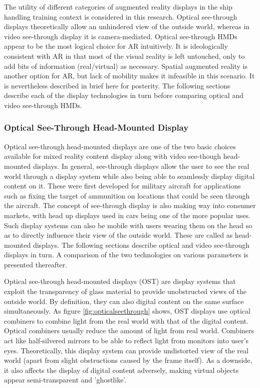 The utility of different categories of augmented reality displays in the ship handling training context is considered in this research. Optical see-through displays theoretically allow an unhindered view of the outside world, whereas in video see-through display it is camera-mediated. Optical see-through HMDs appear to be the most logical choice for AR intuitively. It is ideologically consistent with AR in that most of the visual reality is left untouched, only to add bits of information (real/virtual) as necessary. Spatial augmented reality is another option for AR, but lack of mobility makes it infeasible in this scenario. It is nevertheless described in brief here for posterity. The following sections describe each of the display technologies in turn before comparing optical and video see-through HMDs. 

\subsubsection{Optical See-Through Head-Mounted Display}
Optical see-through head-mounted displays are one of the two basic choices available for mixed reality content display along with video see-though head-mounted displays. In general, see-through displays allow the user to see the real world through a display system while also being able to seamlessly display digital content on it. These were first developed for military aircraft for applications such as fixing the target of ammunition on locations that could be seen through the aircraft. The concept of see-through display is also making way into consumer markets, with head up displays used in cars being one of the more popular uses. Such display systems can also be mobile with users wearing them on the head so as to directly influence their view of the outside world. These are called as head-mounted displays. The following sections describe optical and video see-through displays in turn. A comparison of the two technologies on various parameters is presented thereafter.

Optical see-through head-mounted displays (OST) are display systems that exploit the transparency of glass material to provide unobstructed views of the outside world. By definition, they can also digital content on the same surface simultaneously. As figure \ref{fig:opticalseethrough} shows, OST displays use optical combiners to combine light from the real world with that of the digital content. Optical combiners usually reduce the amount of light from real world. Combiners act like half-silvered mirrors to be able to reflect light from monitors into user's eyes. Theoretically, this display system can provide undistorted view of the real world (apart from slight obstructions caused by the frame itself). As a downside, it also affects the display of digital content adversely, making virtual objects appear semi-transparent and 'ghostlike'.


